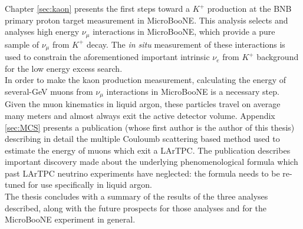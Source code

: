 Chapter \ref{sec:kaon} presents the first steps toward a $K^+$ production at the BNB primary proton target measurement in MicroBooNE. This analysis selects and analyses high energy $\nu_\mu$ interactions in MicroBooNE, which provide a pure sample of $\nu_\mu$ from $K^+$ decay. The \textit{in situ} measurement of these interactions is used to constrain the aforementioned important intrinsic $\nu_e$ from $K^+$ background for the low energy excess search.\\

In order to make the kaon production measurement, calculating the energy of several-GeV muons from $\nu_\mu$ interactions in MicroBooNE is a necessary step. Given the muon kinematics in liquid argon, these particles travel on average many meters and almost always exit the active detector volume. Appendix \ref{sec:MCS} presents a publication (whose first author is the author of this thesis) describing in detail the multiple Couloumb scattering based method used to estimate the energy of muons which exit a LArTPC. The publication describes important discovery made about the underlying phenomenological formula which past LArTPC neutrino experiments have neglected: the formula needs to be re-tuned for use specifically in liquid argon.\\

The thesis concludes with a summary of the results of the three analyses described, along with the future prospects for those analyses and for the MicroBooNE experiment in general.



